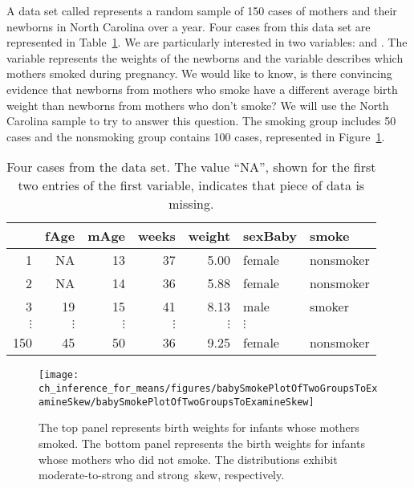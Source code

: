 {A data set called  represents a random sample of 150 cases of mothers and their newborns in North Carolina over a year. Four cases from this data set are represented in Table~\ref{babySmokeDF}. We are particularly interested in two variables:  and . The  variable represents the weights of the newborns and the  variable describes which mothers smoked during pregnancy. We would like to know, is there convincing evidence that newborns from mothers who smoke have a different average birth weight than newborns from mothers who don't smoke? We will use the North Carolina sample to try to answer this question. The smoking group includes 50 cases and the nonsmoking group contains 100 cases, represented in Figure~\ref{babySmokePlotOfTwoGroupsToExamineSkew}.

\begin{table}[h]
\centering
\begin{tabular}{rrrrrll}
  \hline
 & fAge & mAge & weeks & weight & sexBaby & smoke \\ 
  \hline
1 & NA & 13 &  37 & 5.00 & female & nonsmoker \\ 
  2 & NA & 14 &  36 & 5.88 & female & nonsmoker \\ 
  3 & 19 & 15 &  41 & 8.13 & male & smoker \\ 
  $\vdots$ &   $\vdots$ &   $\vdots$ &   $\vdots$ &   $\vdots$ &   $\vdots$ \\
  150 & 45 & 50 &  36 & 9.25 & female & nonsmoker \\ 
   \hline
\end{tabular}
\caption{Four cases from the  data set. The value ``NA'', shown for the first two entries of the first variable, indicates that piece of data is missing.\textC{-2mm}}
\label{babySmokeDF}
\end{table}

\begin{figure}[hhh]
\centering
\texttt{[image: ch\_inference\_for\_means/figures/babySmokePlotOfTwoGroupsToExamineSkew/babySmokePlotOfTwoGroupsToExamineSkew]}
\caption{The top panel represents birth weights for infants whose mothers smoked. The bottom panel represents the birth weights for infants whose mothers who did not smoke. The distributions exhibit moderate-to-strong and strong~skew, respectively.}
\label{babySmokePlotOfTwoGroupsToExamineSkew}
\end{figure}

}
